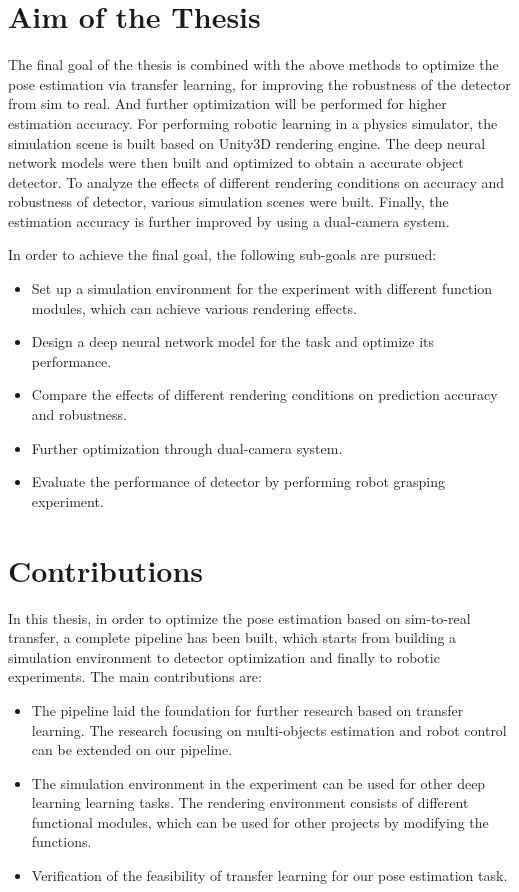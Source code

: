 \section{Aim of the Thesis}
The final goal of the thesis is combined with the above methods to optimize the pose estimation via transfer learning, for improving the robustness of the detector from sim to real. And further optimization will be performed for higher estimation accuracy. For performing robotic learning in a physics simulator, the simulation scene is built based on Unity3D rendering engine. The deep neural network models were then built and optimized to obtain a accurate object detector. To analyze the effects of different rendering conditions on accuracy and robustness of detector, various simulation scenes were built. Finally, the estimation accuracy is further improved by using a dual-camera system.

In order to achieve the final goal, the following sub-goals are pursued:
\begin{itemize}
	\item Set up a simulation environment for the experiment with different function modules, which can achieve various rendering effects.
	\item Design a deep neural network model for the task and optimize its performance.
	\item Compare the effects of different rendering conditions on prediction accuracy and robustness.
	\item Further optimization through dual-camera system. 
	\item Evaluate the performance of detector by performing robot grasping experiment.
\end{itemize}

\section{Contributions}
In this thesis, in order to optimize the pose estimation based on sim-to-real transfer, a complete pipeline has been built, which starts from building a simulation environment to detector optimization and finally to robotic experiments. The main contributions are:

\begin{itemize}
	\item The pipeline laid the foundation for further research based on transfer learning. The research focusing on multi-objects estimation and robot control can be extended on our pipeline.
	\item The simulation environment in the experiment can be used for other deep learning learning tasks. The rendering environment consists of different functional modules, which can be used for other projects by modifying the functions.
	\item Verification of the feasibility of transfer learning for our pose estimation task.
\end{itemize}

